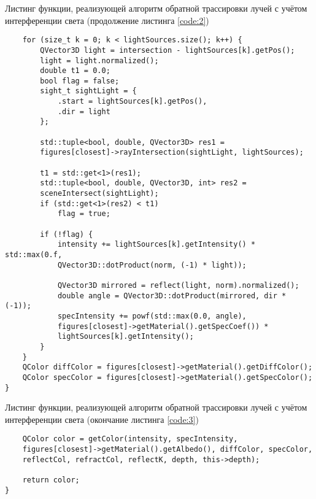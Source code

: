 \begin{code}
\caption{Листинг функции, реализующей алгоритм обратной трассировки лучей с учётом интерференции света (продолжение листинга \ref{code:2})}
\label{code:3}
\begin{verbatim}
    for (size_t k = 0; k < lightSources.size(); k++) {
        QVector3D light = intersection - lightSources[k].getPos();
        light = light.normalized();
        double t1 = 0.0;
        bool flag = false;
        sight_t sightLight = {
            .start = lightSources[k].getPos(),
            .dir = light
        };

        std::tuple<bool, double, QVector3D> res1 = 
        figures[closest]->rayIntersection(sightLight, lightSources);

        t1 = std::get<1>(res1);
        std::tuple<bool, double, QVector3D, int> res2 = 
        sceneIntersect(sightLight);
        if (std::get<1>(res2) < t1)
            flag = true;

        if (!flag) {
            intensity += lightSources[k].getIntensity() * std::max(0.f, 
            QVector3D::dotProduct(norm, (-1) * light));

            QVector3D mirrored = reflect(light, norm).normalized();
            double angle = QVector3D::dotProduct(mirrored, dir * (-1));
            specIntensity += powf(std::max(0.0, angle), 
            figures[closest]->getMaterial().getSpecCoef()) * 
            lightSources[k].getIntensity();
        }
    }
    QColor diffColor = figures[closest]->getMaterial().getDiffColor();
    QColor specColor = figures[closest]->getMaterial().getSpecColor();
}
\end{verbatim}
\end{code}

\begin{code}
\caption{Листинг функции, реализующей алгоритм обратной трассировки лучей с учётом интерференции света (окончание листинга \ref{code:3})}
\label{code:4}
\begin{verbatim}
    QColor color = getColor(intensity, specIntensity, 
    figures[closest]->getMaterial().getAlbedo(), diffColor, specColor, 
    reflectCol, refractCol, reflectK, depth, this->depth);

    return color;
}
\end{verbatim}
\end{code}

